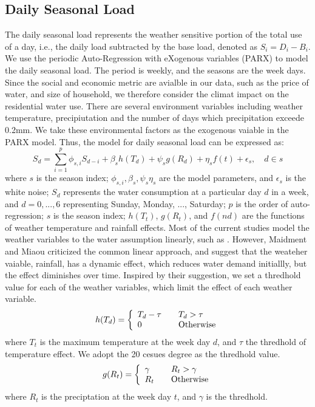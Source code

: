 \documentclass{sig-alternate}
\newcommand{\ie}{i.e.}
\begin{document}
\subsection{Daily Seasonal Load}
The daily seasonal load represents the weather sensitive portion of the total use of a day, \ie, the daily load subtracted by the base load, denoted as $S_i=D_i - B_i$. We use the periodic Auto-Regression with eXogenous variables (PARX) \cite{omid} to model the daily seasonal load. The period is weekly, and the seasons are the week days. Since the social and economic metric are avialble in our data, such as the price of water, and size of household, we therefore consider the climat impact on the residential water use. There are several environment variables including weather temperature, precipiutation and the number of days which precipitation exceede 0.2mm. We take these environmental factors as the exogenous vaiable in the PARX model. Thus, the model for daily seasonal load can be expressed as:
\begin{equation}
S_d = \sum_{i=1}^{p} \phi_{s,i} S_{d-i} + \beta_s h(T_d) + \psi_s g(R_d) + \eta_s f(t) + \epsilon_s,  \quad d \in s
\end{equation}
where $s$ is the season index;  $\phi_{s,i}, \beta_s, \psi_s \eta_s$  are the model parameters, and $\epsilon_s$ is the white noise;  $S_d$ represents the water consumption at a particular day $d$ in a week, and $d=0,...,6$ representing Sunday, Monday, ..., Saturday; $p$ is the order of auto-regression; $s$ is the season index; $h(T_t)$,  $g(R_t)$, and $f(nd)$ are the functions of weather temperature and rainfall effects. Most of the current studies model the weather variables to the water assumption linearly, such as \cite{zhou2002,schleich,bougadis}. However, Maidment and Miaou criticized the common linear approach, and suggest that the weateher vaiable, rainfall, has a dynamic effect, which reduces water demand initiallly, but the effect diminishes over time. Inspired by their suggestion, we set a thredhold value for each of the weather variables, which limit the effect of each weather variable. 
\[ h(T_d) = \left\{ 
  \begin{array}{l l}
    T_d - \tau & \quad T_d>\tau\\
    0 & \quad \text{Otherwise}
  \end{array} \right.\]
where $T_t$ is the maximum temperature at the week day $d$, and $\tau$ the thredhold of temperature effect. We adopt the 20 cesues degree as the thredhold value.
\[ g(R_t) = \left\{ 
  \begin{array}{l l}
    \gamma  & \quad R_t>\gamma\\
    R_t & \quad  \text{Otherwise}
  \end{array} \right.\]
where $R_t$ is the preciptation at the week day $t$, and $\gamma$ is the thredhold. 
\end{document}
